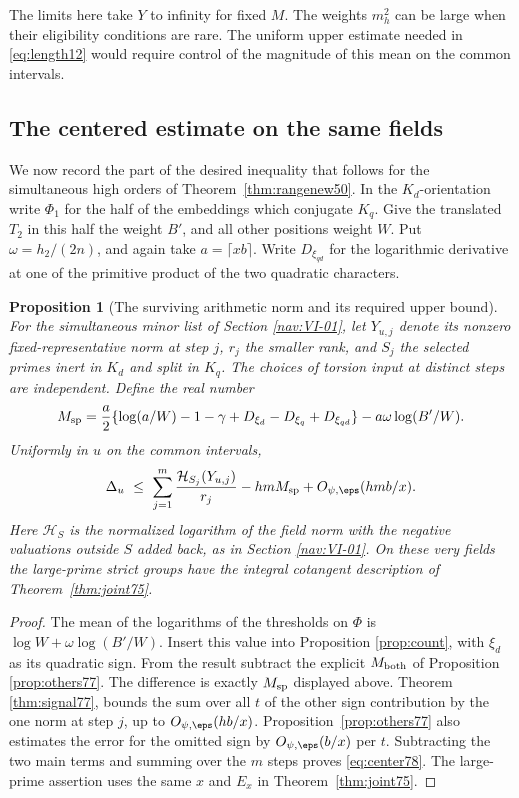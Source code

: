 \documentclass[a4paper,11pt]{article}
\newtheorem{proposition}{Proposition}[section]
\theoremstyle{definition}
\theoremstyle{remark}
\numberwithin{equation}{section}
\begin{document}
The limits here take \(Y\) to infinity for fixed \(M\).
The weights \(m_h^2\) can be large when their eligibility
conditions are rare. The uniform upper estimate needed in
\eqref{eq:length12} would require control of the magnitude
of this mean on the common intervals.

\subsection{The centered estimate on the same fields}\label{nav:II-24}
We now record the part of the desired inequality that follows
for the simultaneous high orders of Theorem~\ref{thm:rangenew50}.
In the \(K_d\)-orientation write \(\Phi_1\) for the half of the
embeddings which conjugate \(K_q\). Give the translated \(T_2\)
in this half the weight \(B'\), and all other positions weight
\(W\). Put \(\omega=h_2/(2n)\), and again take \(a=\lceil xb\rceil\).
Write \(D_{\xi_{qd}}\) for the logarithmic derivative at one of
the primitive product of the two quadratic characters.

\begin{proposition}[The surviving arithmetic norm and its required upper bound]
\label{prop:center78}
For the simultaneous minor list of Section \ref{nav:VI-01}, let
\(Y_{u,j}\) denote its nonzero fixed-representative norm at step
\(j\), \(r_j\) the smaller rank, and \(S_j\) the selected primes
inert in \(K_d\) and split in \(K_q\). The choices of torsion
input at distinct steps are independent. Define the real number
\[
 M_{\rm sp}=\frac a2\{\log(a/W)-1-\gamma+
               D_{\xi_d}-D_{\xi_q}+D_{\xi_{qd}}\}
                       -a\omega\log(B'/W).
\]
Uniformly in \(u\) on the common intervals,
\begin{equation}
 \Delta_u\ \le\ \sum_{j=1}^m
            \frac{\mathcal H_{S_j}(Y_{u,j})}{r_j}
                 -hm M_{\rm sp}+O_{\psi,\eps}(hmb/x).
 \label{eq:center78}
\end{equation}
Here \(\mathcal H_S\) is the normalized logarithm of the field
norm with the negative valuations outside \(S\) added back, as
in Section \ref{nav:VI-01}. On these very fields the large-prime
strict groups have the integral cotangent description of
Theorem~\ref{thm:joint75}.
\end{proposition}
\begin{proof}
The mean of the logarithms of the thresholds on \(\Phi\) is
\(\log W+\omega\log(B'/W)\). Insert this value into Proposition
\ref{prop:count}, with \(\xi_d\) as its quadratic sign. From
the result subtract the explicit \(M_{\rm both}\) of Proposition \ref{prop:others77}. The difference is exactly \(M_{\rm sp}\)
displayed above. Theorem \ref{thm:signal77}, bounds the sum over
all \(t\) of the other sign contribution by the one norm at step
\(j\), up to \(O_{\psi,\eps}(hb/x)\). Proposition~\ref{prop:others77} also
estimates the error for the omitted sign by \(O_{\psi,\eps}(b/x)\)
per \(t\). Subtracting the two main terms and summing over the
\(m\) steps proves \eqref{eq:center78}. The large-prime assertion
uses the same \(x\) and \(E_x\) in Theorem~\ref{thm:joint75}.
\end{proof}
\end{document}
